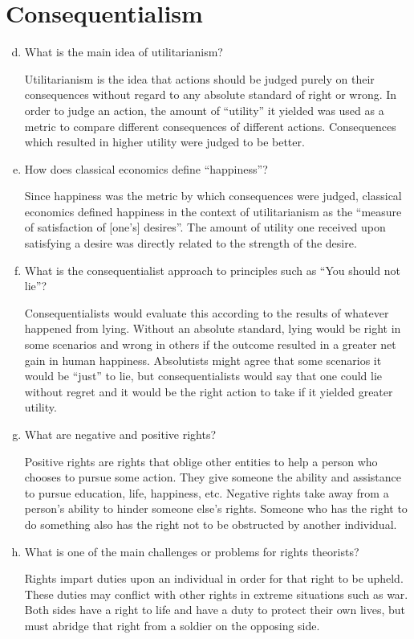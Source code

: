 \documentclass{article}
\begin{document}
\begin{enumerate}[a)]
\end{enumerate}

\section*{Consequentialism}
\begin{enumerate}[a)]
  \setcounter{enumi}{3}
  \item What is the main idea of utilitarianism?
  \par Utilitarianism is the idea that actions should be judged purely on their consequences without regard to any absolute standard of right or wrong. In order to judge an action, the amount of ``utility'' it yielded was used as a metric to compare different consequences of different actions. Consequences which resulted in higher utility were judged to be better.
  \item How does classical economics define ``happiness''?
  \par Since happiness was the metric by which consequences were judged, classical economics defined happiness in the context of utilitarianism as the ``measure of satisfaction of [one's] desires''. The amount of utility one received upon satisfying a desire was directly related to the strength of the desire.
  \item What is the consequentialist approach to principles such as ``You should not lie''?
  \par Consequentialists would evaluate this according to the results of whatever happened from lying. Without an absolute standard, lying would be right in some scenarios and wrong in others if the outcome resulted in a greater net gain in human happiness. Absolutists might agree that some scenarios it would be ``just'' to lie, but consequentialists would say that one could lie without regret and it would be the right action to take if it yielded greater utility.
  \item What are negative and positive rights?
  \par Positive rights are rights that oblige other entities to help a person who chooses to pursue some action. They give someone the ability and assistance to pursue education, life, happiness, etc. Negative rights take away from a person's ability to hinder someone else's rights. Someone who has the right to do something also has the right not to be obstructed by another individual.
  \item What is one of the main challenges or problems for rights theorists?
  \par Rights impart duties upon an individual in order for that right to be upheld. These duties may conflict with other rights in extreme situations such as war. Both sides have a right to life and have a duty to protect their own lives, but must abridge that right from a soldier on the opposing side.
\end{enumerate}
\end{document}
